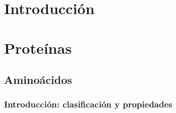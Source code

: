 \chapter{Introducción}
\chapter{Proteínas}
\section{Aminoácidos}
\subsection{Introducción: clasificación y propiedades}